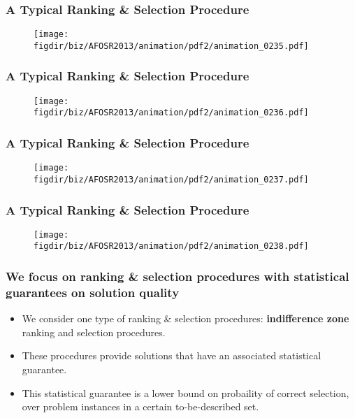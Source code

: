 \documentclass[13pt]{beamer}
\newcommand{\figdir}{../../fig}
\begin{document}
{\begin{frame}\frametitle{A Typical Ranking \& Selection Procedure}\begin{figure}\texttt{[image: \\figdir/biz/AFOSR2013/animation/pdf2/animation\_0235.pdf]}\end{figure}\end{frame}
\begin{frame}\frametitle{A Typical Ranking \& Selection Procedure}\begin{figure}\texttt{[image: \\figdir/biz/AFOSR2013/animation/pdf2/animation\_0236.pdf]}\end{figure}\end{frame}
\begin{frame}\frametitle{A Typical Ranking \& Selection Procedure}\begin{figure}\texttt{[image: \\figdir/biz/AFOSR2013/animation/pdf2/animation\_0237.pdf]}\end{figure}\end{frame}
\begin{frame}\frametitle{A Typical Ranking \& Selection Procedure}\begin{figure}\texttt{[image: \\figdir/biz/AFOSR2013/animation/pdf2/animation\_0238.pdf]}\end{figure}\end{frame}
}

\begin{frame}\frametitle{We focus on ranking \& selection procedures with statistical guarantees on solution quality}
  \begin{itemize}
    \item We consider one type of ranking \& selection procedures: {\bf indifference zone} ranking and selection procedures.
    \item These procedures provide solutions that have an associated statistical guarantee.
    \item This statistical guarantee is a lower bound on probaility of correct selection, over problem instances in a certain to-be-described set.
  \end{itemize}
\end{frame}
\end{document}
